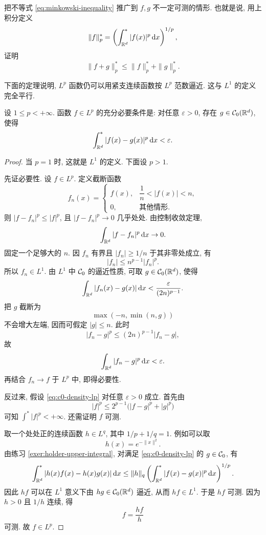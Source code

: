 \begin{exer}
	\label{exer:minkowski-upper-integral}
	把不等式 \eqref{eq:minkowski-inequality} 推广到 \(f,g\) 不一定可测的情形. 也就是说, 用上积分定义
	\[
	\|f\|_p^{*}
	=
	\left(\int_{\mathbb{R}^d}^{*}|f(x)|^p\,\dd x\right)^{1/p},
	\]
	证明
	\[
	\|f+g\|_p^{*}
	\leq
	\|f\|_p^{*}+\|g\|_p^{*}.
	\]
\end{exer}

下面的定理说明, \(L^p\) 函数仍可以用紧支连续函数按 \(L^p\) 范数逼近. 这与 \(L^1\) 的定义完全平行.

\begin{thm}[\(\C_0\) 在 \(L^p\) 中的稠密性]
	\label{thm:c0-dense-in-lp}
	设 \(1\leq p<+\infty\). 函数 \(f\in L^p\) 的充分必要条件是: 对任意 \(\varepsilon>0\), 存在 \(g\in\mathcal{C}_0(\mathbb{R}^d)\), 使得
	\begin{equation}
		\int_{\mathbb{R}^d}^{*}|f(x)-g(x)|^p\,\dd x<\varepsilon.
		\label{eq:c0-density-lp}
	\end{equation}
\end{thm}

\begin{proof}
	当 \(p=1\) 时, 这就是 \(L^1\) 的定义. 下面设 \(p>1\).
	
	先证必要性. 设 \(f\in L^p\). 定义截断函数
	\[
	f_n(x)=
	\begin{cases}
		f(x), & \dfrac1n<|f(x)|<n,\\[0.8em]
		0, & \text{其他情形}.
	\end{cases}
	\]
	则 \(|f-f_n|^p\leq |f|^p\), 且 \(|f-f_n|^p\to0\) 几乎处处. 由控制收敛定理,
	\[
	\int_{\mathbb{R}^d}|f-f_n|^p\,\dd x\to0.
	\]
	固定一个足够大的 \(n\). 因 \(f_n\) 有界且 \(|f_n|\geq 1/n\) 于其非零处成立, 有
	\[
	|f_n|\leq n^{p-1}|f_n|^p.
	\]
	所以 \(f_n\in L^1\). 由 \(L^1\) 中 \(\C_0\) 的逼近性质, 可取 \(g\in\mathcal{C}_0(\mathbb{R}^d)\), 使得
	\[
	\int_{\mathbb{R}^d}|f_n(x)-g(x)|\,\dd x
	<
	\frac{\varepsilon}{(2n)^{p-1}}.
	\]
	把 \(g\) 截断为
	\[
	\max(-n,\min(n,g))
	\]
	不会增大左端, 因而可假定 \(|g|\leq n\). 此时
	\[
	|f_n-g|^p\leq (2n)^{p-1}|f_n-g|,
	\]
	故
	\[
	\int_{\mathbb{R}^d}|f_n-g|^p\,\dd x<\varepsilon.
	\]
	再结合 \(f_n\to f\) 于 \(L^p\) 中, 即得必要性.
	
	反过来, 假设 \eqref{eq:c0-density-lp} 对任意 \(\varepsilon>0\) 成立. 首先由
	\[
	|f|^p\leq 2^{p-1}\bigl(|f-g|^p+|g|^p\bigr)
	\]
	可知 \(\int^*|f|^p<+\infty\). 还需证明 \(f\) 可测.
	
	取一个处处正的连续函数 \(h\in L^q\), 其中 \(1/p+1/q=1\). 例如可以取
	\[
	h(x)=e^{-\|x\|^2}.
	\]
	由练习 \ref{exer:holder-upper-integral}, 对满足 \eqref{eq:c0-density-lp} 的 \(g\in\mathcal{C}_0\), 有
	\[
	\int_{\mathbb{R}^d}^{*}|h(x)f(x)-h(x)g(x)|\,\dd x
	\leq
	\|h\|_q
	\left(\int_{\mathbb{R}^d}^{*}|f(x)-g(x)|^p\,\dd x\right)^{1/p}.
	\]
	因此 \(hf\) 可以在 \(L^1\) 意义下由 \(hg\in\mathcal{C}_0(\mathbb{R}^d)\) 逼近, 从而 \(hf\in L^1\). 于是 \(hf\) 可测. 因为 \(h>0\) 且 \(1/h\) 连续, 得
	\[
	f=\frac{hf}{h}
	\]
	可测. 故 \(f\in L^p\).
\end{proof}


